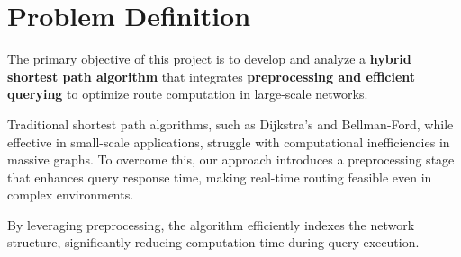 \chapter{Problem Definition}

The primary objective of this project is to develop and analyze a \textbf{hybrid shortest path algorithm} that integrates \textbf{preprocessing and efficient querying} to optimize route computation in large-scale networks. \\ \medskip

Traditional shortest path algorithms, such as Dijkstra’s and Bellman-Ford, while effective in small-scale applications, struggle with computational inefficiencies in massive graphs. To overcome this, our approach introduces a preprocessing stage that enhances query response time, making real-time routing feasible even in complex environments. \\ \medskip

By leveraging preprocessing, the algorithm efficiently indexes the network structure, significantly reducing computation time during query execution.
